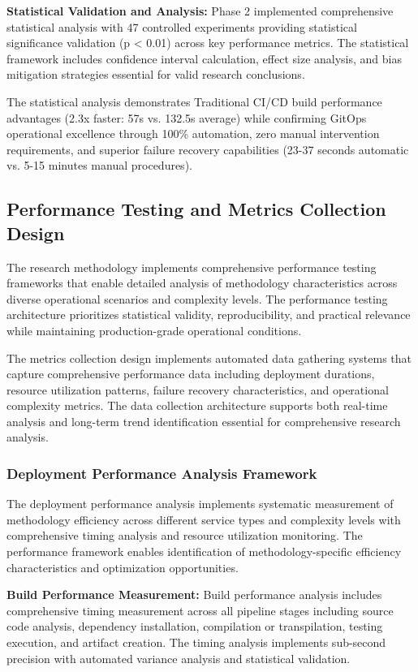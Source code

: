 \textbf{Statistical Validation and Analysis:}
Phase 2 implemented comprehensive statistical analysis with 47 controlled experiments providing statistical significance validation (p < 0.01) across key performance metrics. The statistical framework includes confidence interval calculation, effect size analysis, and bias mitigation strategies essential for valid research conclusions.

The statistical analysis demonstrates Traditional CI/CD build performance advantages (2.3x faster: 57s vs. 132.5s average) while confirming GitOps operational excellence through 100\% automation, zero manual intervention requirements, and superior failure recovery capabilities (23-37 seconds automatic vs. 5-15 minutes manual procedures).

\subsection{Performance Testing and Metrics Collection Design}

The research methodology implements comprehensive performance testing frameworks that enable detailed analysis of methodology characteristics across diverse operational scenarios and complexity levels. The performance testing architecture prioritizes statistical validity, reproducibility, and practical relevance while maintaining production-grade operational conditions.

The metrics collection design implements automated data gathering systems that capture comprehensive performance data including deployment durations, resource utilization patterns, failure recovery characteristics, and operational complexity metrics. The data collection architecture supports both real-time analysis and long-term trend identification essential for comprehensive research analysis.

\subsubsection{Deployment Performance Analysis Framework}

The deployment performance analysis implements systematic measurement of methodology efficiency across different service types and complexity levels with comprehensive timing analysis and resource utilization monitoring. The performance framework enables identification of methodology-specific efficiency characteristics and optimization opportunities.

\textbf{Build Performance Measurement:}
Build performance analysis includes comprehensive timing measurement across all pipeline stages including source code analysis, dependency installation, compilation or transpilation, testing execution, and artifact creation. The timing analysis implements sub-second precision with automated variance analysis and statistical validation.

